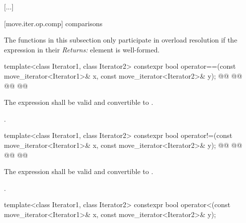 [...]

[move.iter.op.comp]{ comparisons}

{\color{oldclr}
\pnum
The functions in this subsection only participate in overload resolution if the
expression in their \textit{Returns:} element is well-formed.
} %

%
\begin{itemdecl}
template<class Iterator1, class Iterator2>
constexpr bool operator==(const move_iterator<Iterator1>& x, const move_iterator<Iterator2>& y);
@@
@@
@@
@@
\end{itemdecl}

\begin{itemdescr}
{\color{newclr}
\pnum
\constraints
The expression  shall be valid and
convertible to .
} %

\pnum
\returns {}.
\end{itemdescr}

%
\begin{itemdecl}
template<class Iterator1, class Iterator2>
constexpr bool operator!=(const move_iterator<Iterator1>& x, const move_iterator<Iterator2>& y);
@@
@@
@@
@@
\end{itemdecl}

\begin{itemdescr}
{\color{newclr}
\pnum
\constraints
The expression  shall be valid and
convertible to .
} %

\pnum
\returns {}.
\end{itemdescr}

%
\begin{itemdecl}
template<class Iterator1, class Iterator2>
constexpr bool operator<(const move_iterator<Iterator1>& x, const move_iterator<Iterator2>& y);
\end{itemdecl}

